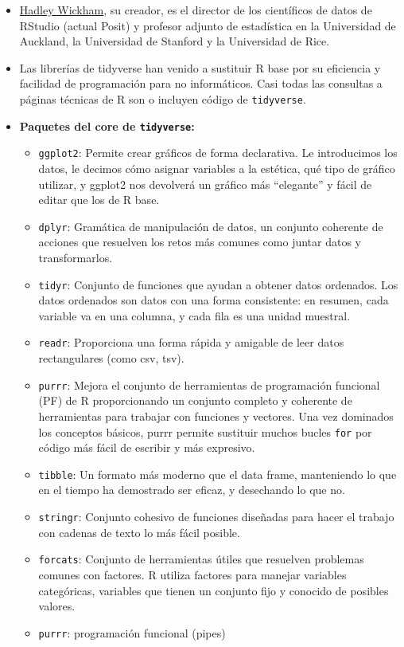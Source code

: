 \documentclass[
  letterpaper,
  DIV=11,
  numbers=noendperiod]{scrreprt}
\begin{document}
\begin{itemize}
\item
  \href{https://hadley.nz/}{Hadley Wickham}, su creador, es el director
  de los científicos de datos de RStudio (actual Posit) y profesor
  adjunto de estadística en la Universidad de Auckland, la Universidad
  de Stanford y la Universidad de Rice.
\item
  Las librerías de tidyverse han venido a sustituir R base por su
  eficiencia y facilidad de programación para no informáticos. Casi
  todas las consultas a páginas técnicas de R son o incluyen código de
  \texttt{tidyverse}.
\item
  \textbf{Paquetes del core de \texttt{tidyverse}:}

  \begin{itemize}
  \item
    \texttt{ggplot2}: Permite crear gráficos de forma declarativa. Le
    introducimos los datos, le decimos cómo asignar variables a la
    estética, qué tipo de gráfico utilizar, y ggplot2 nos devolverá un
    gráfico más ``elegante'' y fácil de editar que los de R base.
  \item
    \texttt{dplyr}: Gramática de manipulación de datos, un conjunto
    coherente de acciones que resuelven los retos más comunes como
    juntar datos y transformarlos.
  \item
    \texttt{tidyr}: Conjunto de funciones que ayudan a obtener datos
    ordenados. Los datos ordenados son datos con una forma consistente:
    en resumen, cada variable va en una columna, y cada fila es una
    unidad muestral.
  \item
    \texttt{readr}: Proporciona una forma rápida y amigable de leer
    datos rectangulares (como csv, tsv).
  \item
    \texttt{purrr}: Mejora el conjunto de herramientas de programación
    funcional (PF) de R proporcionando un conjunto completo y coherente
    de herramientas para trabajar con funciones y vectores. Una vez
    dominados los conceptos básicos, purrr permite sustituir muchos
    bucles \texttt{for} por código más fácil de escribir y más
    expresivo.
  \item
    \texttt{tibble}: Un formato más moderno que el data frame,
    manteniendo lo que en el tiempo ha demostrado ser eficaz, y
    desechando lo que no.
  \item
    \texttt{stringr}: Conjunto cohesivo de funciones diseñadas para
    hacer el trabajo con cadenas de texto lo más fácil posible.
  \item
    \texttt{forcats}: Conjunto de herramientas útiles que resuelven
    problemas comunes con factores. R utiliza factores para manejar
    variables categóricas, variables que tienen un conjunto fijo y
    conocido de posibles valores.
  \item
    \texttt{purrr}: programación funcional (pipes)
  \end{itemize}


\end{itemize}
\end{document}
